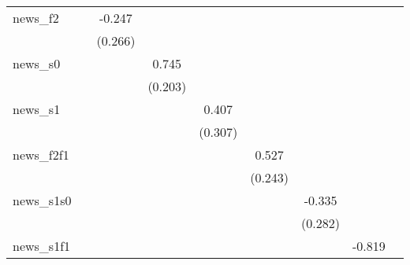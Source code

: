 {\begin{tabular}{l*{8}{c}}
\addlinespace
news\_f2     &                     &      -0.247         &                     &                     &                     &                     &                     &                     \\
            &                     &     (0.266)         &                     &                     &                     &                     &                     &                     \\
\addlinespace
news\_s0     &                     &                     &       0.745\sym{***}&                     &                     &                     &                     &                     \\
            &                     &                     &     (0.203)         &                     &                     &                     &                     &                     \\
\addlinespace
news\_s1     &                     &                     &                     &       0.407         &                     &                     &                     &                     \\
            &                     &                     &                     &     (0.307)         &                     &                     &                     &                     \\
\addlinespace
news\_f2f1   &                     &                     &                     &                     &       0.527\sym{**} &                     &                     &                     \\
            &                     &                     &                     &                     &     (0.243)         &                     &                     &                     \\
\addlinespace
news\_s1s0   &                     &                     &                     &                     &                     &      -0.335         &                     &                     \\
            &                     &                     &                     &                     &                     &     (0.282)         &                     &                     \\
\addlinespace
news\_s1f1   &                     &                     &                     &                     &                     &                     &      -0.819         &                     \\

\end{tabular}}
